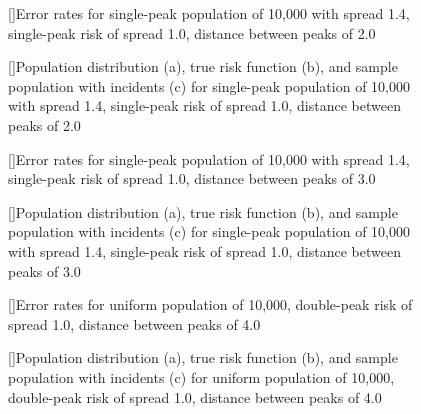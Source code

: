 {%

\begin{figure}[!htb]
    
    []{Error rates for single-peak population of 10,000 with \gls{spread} 1.4, single-peak risk of \gls{spread} 1.0, distance between peaks of 2.0}
    \label{tab:mean_error_rates:p1.4_100_1_1h_2s}
    
    []{Population distribution (a), true risk function (b), and sample population with incidents (c) for single-peak population of 10,000 with \gls{spread} 1.4, single-peak risk of \gls{spread} 1.0, distance between peaks of 2.0}
    \label{fig:distributions:p1.4_100_1_1h_2s}    
\end{figure}


\begin{figure}[!htb]
    
    []{Error rates for single-peak population of 10,000 with \gls{spread} 1.4, single-peak risk of \gls{spread} 1.0, distance between peaks of 3.0}
    \label{tab:mean_error_rates:p1.4_100_1_1h_3s}
    
    []{Population distribution (a), true risk function (b), and sample population with incidents (c) for single-peak population of 10,000 with \gls{spread} 1.4, single-peak risk of \gls{spread} 1.0, distance between peaks of 3.0}
    \label{fig:distributions:p1.4_100_1_1h_3s}    
\end{figure}


\begin{figure}[!htb]
    
    []{Error rates for uniform population of 10,000, double-peak risk of spread 1.0, distance between peaks of 4.0}
    \label{tab:mean_error_rates:p1.4_100_1_1h_4s}
    
    []{Population distribution (a), true risk function (b), and sample population with incidents (c) for uniform population of 10,000, double-peak risk of \gls{spread} 1.0, distance between peaks of 4.0}
    \label{fig:distributions:p1.4_100_1_1h_4s}    
\end{figure}

\setpath{}
}